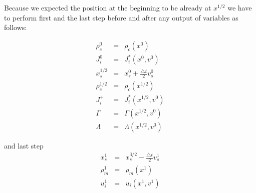 \documentclass[oneside,branding,toc,article]{sat}
\begin{document}
Because we expected the position at the beginning to be already at $x^{1/2}$ we
have to perform first and the last step before and after any output of
variables as follows:

\begin{eqnarray}
  \label{eq:first}
  \rho_c^{0} & = & \rho_c (x^{0}) \nonumber \\
  J_i^0 & = & J_i^* (x^{0}, v^0) \nonumber \\
  x_s^{1/2} & = & x_s^{0} + \frac{\triangle t}{2} v_s^{0} \nonumber \\
  \rho_c^{1/2} & = & \rho_c (x^{1/2}) \nonumber \\
  J_i^+ & = & J_i^* (x^{1/2}, v^0) \nonumber \\
  \Gamma & = & \Gamma (x^{1/2}, v^0) \nonumber \\
  \Lambda & = & \Lambda (x^{1/2}, v^0) \nonumber
\end{eqnarray}

and last step
\begin{eqnarray}
  \label{eq:last}
  x_s^{1} & = & x_s^{3/2} - \frac{\triangle t}{2} v_s^{1} \nonumber \\
  \rho_m^{1} & = & \rho_m (x^{1}) \nonumber \\
  u_i^{1} & = & u_i (x^{1}, v^1) \nonumber
\end{eqnarray}
\end{document}
